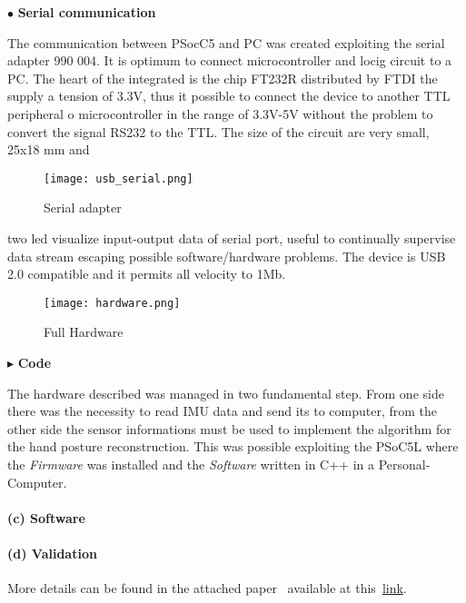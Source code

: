 \noindent $\bullet$ \textbf{Serial communication}

The communication between PSocC5 and PC was created exploiting the serial adapter 990 004. It is optimum to connect microcontroller and locig circuit to a PC. The heart of the integrated is the chip FT232R distributed by FTDI the supply a tension of 3.3V, thus it possible to connect the device to another TTL peripheral o microcontroller in the range of 3.3V-5V without the problem to convert the signal RS232 to  the TTL. The size of the circuit are very small, 25x18 mm and
\begin{figure}[h]
\centering
\texttt{[image: usb\_serial.png]}
\caption{Serial adapter}
\label{fig:serial_adapter}
\end{figure}
two led visualize  input-output data of serial port, useful to continually supervise data stream escaping possible software/hardware problems. The device is USB 2.0 compatible and it permits all velocity to 1Mb. 

\begin{figure}[h]
\centering
\texttt{[image: hardware.png]}
\caption{Full Hardware}
\label{fig:hardware}
\end{figure}


\noindent $\blacktriangleright$  \textbf{Code} \\ %
\newline

The hardware described was managed in two fundamental step.  From one side there was the necessity to read IMU data and send its to computer, from the other side the sensor informations must be used to implement the algorithm for the  hand posture reconstruction.  
This was possible exploiting the PSoC5L where the \textit{Firmware} was installed and the \textit{Software} written in C++ in a Personal-Computer.

\paragraph{(c) Software}

 




\paragraph{(d) Validation}

More details can be found in the attached paper~\cite{rif} available at this~\href{./attachedPapers/ReconstructionPosturesImuMeasurements.pdf}{link}.
